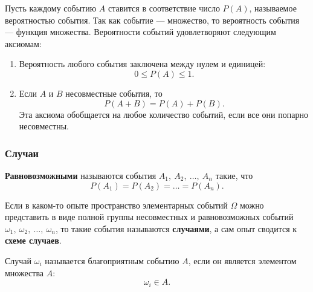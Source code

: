 \documentclass[a4paper]{article}
\newcommand{\key}[1]{{\color{Medium}\bfseries #1}}
\begin{document}
                Пусть каждому событию $A$ ставится в соответствие число $P(A)$, называемое вероятностью события. Так как событие --- множество, то вероятность события --- функция множества. Вероятности событий удовлетворяют следующим аксиомам:
                \begin{enumerate}
                    \item Вероятность любого события заключена между нулем и единицей:
                        \begin{equation*}
                            0 \leqslant P(A) \leqslant 1 .
                        \end{equation*}
                        
                    \item Если $A$ и $B$ несовместные события, то
                        \begin{equation*}
                            P(A + B) = P(A) + P(B) .
                        \end{equation*}
                        Эта аксиома обобщается на любое количество событий, если все они попарно несовместны.
                \end{enumerate}

            \subsubsection{Случаи}

                \key{Равновозможными} называются события $A_1 , \: A_2 , \: \ldots , \: A_n$ такие, что
                \begin{equation*}
                    P(A_1) = P(A_2) = \ldots = P(A_n) .
                \end{equation*}
                
                Если в каком-то опыте пространство элементарных событий $\Omega$ можно представить в виде полной группы несовместных и равновозможных событий $\omega_1 , \: \omega_2 , \: \ldots , \: \omega_n$, то такие события называются \key{случаями}, а сам опыт сводится к \key{схеме случаев}.

                Случай $\omega_i$ называется благоприятным событию $A$, если он является элементом множества $A$:
                \begin{equation*}
                    \omega_i \in A .
                \end{equation*}
\end{document}
